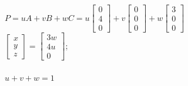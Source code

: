 \documentclass[letterpaper, 8pt]{extarticle}
\begin{document}
\begin{multicols*}{4}
    $
        P = uA + vB + wC
        = u \begin{bmatrix}
            0 \\ 4 \\ 0
        \end{bmatrix}
        + v \begin{bmatrix}
            0 \\ 0 \\ 0
        \end{bmatrix}
        + w \begin{bmatrix}
            3 \\ 0 \\ 0
        \end{bmatrix}
    $\\
    $\begin{bmatrix}
            x \\ y \\ z
        \end{bmatrix}
        = \begin{bmatrix}
            3w \\ 4u \\ 0
        \end{bmatrix}
    $;
    \\
    \\
    $u + v + w = 1$\\





\end{multicols*}
\end{document}
